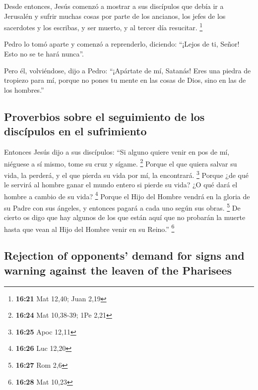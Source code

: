 \begin{paracol}{2}
 Desde entonces, Jesús comenzó a mostrar a sus discípulos
que debía ir a Jerusalén y sufrir muchas cosas por parte de los
ancianos, los jefes de los sacerdotes y los escribas, y ser muerto, y al
tercer día resucitar. \footnote{\textbf{16:21} Mat 12,40; Juan 2,19}

 Pedro lo tomó aparte y comenzó a reprenderlo, diciendo:
``¡Lejos de ti, Señor! Esto no se te hará nunca''.

 Pero él, volviéndose, dijo a Pedro: ``¡Apártate de mí,
Satanás! Eres una piedra de tropiezo para mí, porque no pones tu mente
en las cosas de Dios, sino en las de los hombres.''

\hypertarget{proverbios-sobre-el-seguimiento-de-los-discuxedpulos-en-el-sufrimiento}{%
\subsection{Proverbios sobre el seguimiento de los discípulos en el
sufrimiento}\label{proverbios-sobre-el-seguimiento-de-los-discuxedpulos-en-el-sufrimiento}}

 Entonces Jesús dijo a sus discípulos: ``Si alguno quiere
venir en pos de mí, niéguese a sí mismo, tome su cruz y sígame.
\footnote{\textbf{16:24} Mat 10,38-39; 1Pe 2,21}  Porque
el que quiera salvar su vida, la perderá, y el que pierda su vida por
mí, la encontrará. \footnote{\textbf{16:25} Apoc 12,11} 
Porque ¿de qué le servirá al hombre ganar el mundo entero si pierde su
vida? ¿O qué dará el hombre a cambio de su vida? \footnote{\textbf{16:26}
  Luc 12,20}  Porque el Hijo del Hombre vendrá en la
gloria de su Padre con sus ángeles, y entonces pagará a cada uno según
sus obras. \footnote{\textbf{16:27} Rom 2,6}  De cierto
os digo que hay algunos de los que están aquí que no probarán la muerte
hasta que vean al Hijo del Hombre venir en su Reino.'' \footnote{\textbf{16:28}
  Mat 10,23}

\switchcolumn
\begin{otherlanguage}{english}

\hypertarget{rejection-of-opponents-demand-for-signs-and-warning-against-the-leaven-of-the-pharisees}{%
\subsection{Rejection of opponents' demand for signs and warning against
the leaven of the
Pharisees}\label{rejection-of-opponents-demand-for-signs-and-warning-against-the-leaven-of-the-pharisees}}


\end{otherlanguage}
\end{paracol}
